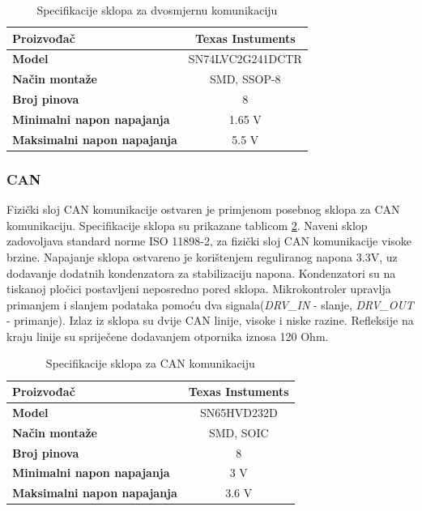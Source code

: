 \documentclass[11pt,a4paper]{article}
\begin{document}
\begin{table}[H]
	\centering
	\caption{Specifikacije sklopa za dvosmjernu komunikaciju}
	\label{tab:specifikacija_dynamixel_buffer}
	\begin{tabular}{|l|c|}
		\hline
		\textbf{Proizvođač} & Texas Instuments \\ \hline 
		\textbf{Model} & SN74LVC2G241DCTR \\ \hline 
		\textbf{Način montaže} & SMD, SSOP-8 \\ \hline 
		\textbf{Broj pinova} & 8 \\ \hline 
		\textbf{Minimalni napon napajanja} & 1.65 V \\ \hline 
		\textbf{Maksimalni napon napajanja} & 5.5 V    \\ \hline
	\end{tabular}
\end{table}


\subsubsection{CAN}
Fizički sloj CAN komunikacije ostvaren je primjenom posebnog sklopa za CAN komunikaciju. Specifikacije sklopa su prikazane tablicom \ref{tab:specifikacija_CAN_bus}. Naveni sklop zadovoljava standard norme ISO 11898-2, za fizički sloj CAN komunikacije visoke brzine. Napajanje sklopa ostvareno je korištenjem reguliranog napona 3.3V, uz dodavanje dodatnih kondenzatora za stabilizaciju napona. Kondenzatori su na tiskanoj pločici postavljeni neposredno pored sklopa. Mikrokontroler upravlja primanjem i slanjem podataka pomoću dva signala(\textit{DRV\_IN} - slanje, \textit{DRV\_OUT} - primanje). Izlaz iz sklopa su dvije CAN linije, visoke i niske razine. Refleksije na kraju linije su spriječene dodavanjem otpornika iznosa 120 Ohm.

\begin{table}[H]
	\centering
	\caption{Specifikacije sklopa za CAN komunikaciju}
	\label{tab:specifikacija_CAN_bus}
	\begin{tabular}{|l|c|}
		\hline
		\textbf{Proizvođač} & Texas Instuments \\ \hline 
		\textbf{Model} &  SN65HVD232D \\ \hline 
		\textbf{Način montaže} & SMD, SOIC \\ \hline 
		\textbf{Broj pinova} & 8 \\ \hline 
		\textbf{Minimalni napon napajanja} & 3 V \\ \hline 
		\textbf{Maksimalni napon napajanja} & 3.6 V    \\ \hline
	\end{tabular}
\end{table}
\end{document}
